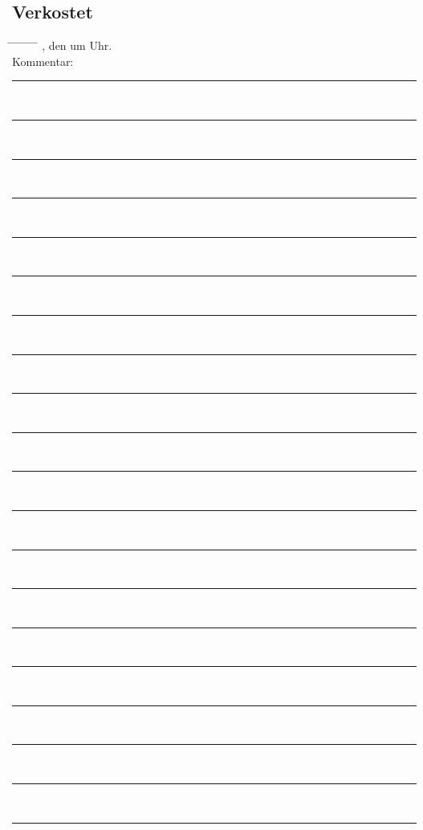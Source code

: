 \documentclass[12pt,oneside,a4paper]{scrartcl}
\begin{document}
{\subsection*{Verkostet}
\begin{tabbing}
	\hspace{1cm} \= \hspace{1cm} \= \hspace{1cm} \= \hspace{1cm} \= \hspace{1cm} \= \hspace{1cm} \= \hspace{1cm} \= \hspace{1cm} \= \kill
	\> \hspace{4cm}, den \hspace{4cm} um \hspace{2.5cm} Uhr.\\
	\> Kommentar: \>\>\> \rule[-0.2cm]{13cm}{1pt}\\
	\> \>  \rule[-0.2cm]{15.3cm}{1pt}\\
	\> \>  \rule[-0.2cm]{15.3cm}{1pt}\\
	\> \>  \rule[-0.2cm]{15.3cm}{1pt}\\		
	\> \>  \rule[-0.2cm]{15.3cm}{1pt}\\
	\> \>  \rule[-0.2cm]{15.3cm}{1pt}\\
	\> \>  \rule[-0.2cm]{15.3cm}{1pt}\\
	\> \>  \rule[-0.2cm]{15.3cm}{1pt}\\
	\> \>  \rule[-0.2cm]{15.3cm}{1pt}\\
	\> \>  \rule[-0.2cm]{15.3cm}{1pt}\\
	\> \>  \rule[-0.2cm]{15.3cm}{1pt}\\
	\> \>  \rule[-0.2cm]{15.3cm}{1pt}\\
	\> \>  \rule[-0.2cm]{15.3cm}{1pt}\\
	\> \>  \rule[-0.2cm]{15.3cm}{1pt}\\
	\> \>  \rule[-0.2cm]{15.3cm}{1pt}\\
	\> \>  \rule[-0.2cm]{15.3cm}{1pt}\\
	\> \>  \rule[-0.2cm]{15.3cm}{1pt}\\
	\> \>  \rule[-0.2cm]{15.3cm}{1pt}\\
	\> \>  \rule[-0.2cm]{15.3cm}{1pt}\\
	\> \>  \rule[-0.2cm]{15.3cm}{1pt}
\end{tabbing}}
\end{document}

